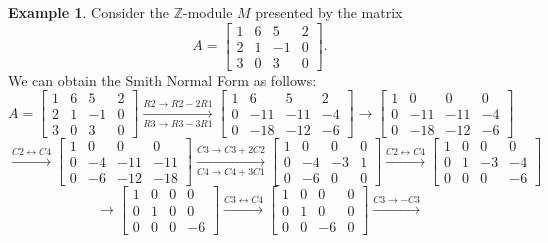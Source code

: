 \documentclass[12pt]{report}
\numberwithin{equation}{section}
\numberwithin{theorem}{chapter}
\theoremstyle{definition}
\newtheorem{example}[theorem]{Example}
\newtheorem*{basic properties}{Basic Properties}
\newtheorem*{Important Remark}{Important Remark}
\newcommand{\Z}{\mathbb{Z}}
\begin{document}
\begin{example}
Consider the $\Z$-module $M$ presented by the matrix
$$A=\begin{bmatrix}
1 & 6 & 5 & 2 \\
2 & 1 & -1 & 0 \\
3 & 0 & 3 & 0
\end{bmatrix}.$$
We can obtain the Smith Normal Form as follows:
$$A=\begin{bmatrix}
1 & 6 & 5 & 2 \\
2 & 1 & -1 & 0 \\
3 & 0 & 3 & 0
\end{bmatrix} \xrightarrow[R3 \to R3-3R1]{R2 \to R2-2R1}
\begin{bmatrix}
1 & 6 & 5 & 2 \\
0 & -11 & -11 & -4 \\
0 & -18 & -12 & -6
\end{bmatrix} \rightarrow 
\begin{bmatrix}
1 & 0 & 0  & 0 \\
0 & -11 & -11 & -4 \\
0 & -18 & -12 & -6
\end{bmatrix}$$
$$\xrightarrow{C2 \leftrightarrow C4}
\begin{bmatrix}
1 & 0 & 0  & 0 \\
0 & -4 & -11 & -11 \\
0 & -6 & -12 & -18
\end{bmatrix}
\xrightarrow[C4 \to C4 + 3C1]{C3 \to C3+2C2}
\begin{bmatrix}
1 & 0 & 0  & 0 \\
0 & -4 & -3 & 1 \\
0 & -6 & 0 & 0
\end{bmatrix}
\xrightarrow{C2 \leftrightarrow C4}
\begin{bmatrix}
1 & 0 & 0  & 0 \\
0 & 1 & -3 & -4 \\
0 & 0 & 0 & -6
\end{bmatrix}$$
$$\rightarrow
\begin{bmatrix}
1 & 0 & 0  & 0 \\
0 & 1 & 0 & 0\\
0 & 0 & 0 & -6
\end{bmatrix}
\xrightarrow{C3 \leftrightarrow C4}
\begin{bmatrix}
1 & 0 & 0  & 0 \\
0 & 1 & 0 & 0\\
0 & 0 & -6 & 0
\end{bmatrix}
\xrightarrow{C3 \to -C3}
$$
\end{example}
\end{document}
